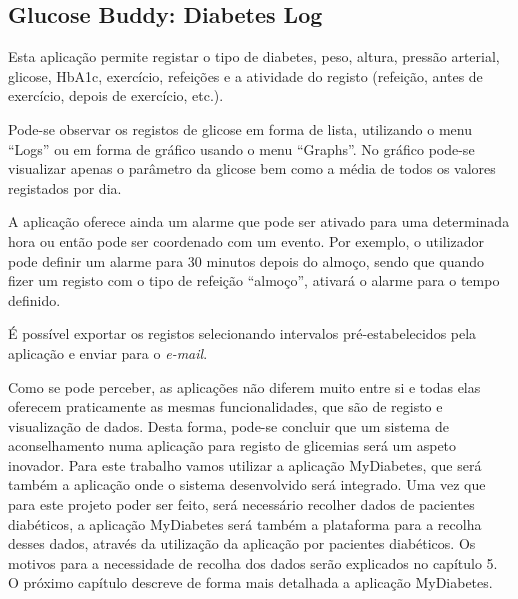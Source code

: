 \subsection{Glucose Buddy: Diabetes Log}

Esta aplicação permite registar o tipo de diabetes, peso, altura, pressão arterial, glicose, HbA1c, exercício, refeições e a atividade do registo (refeição, antes de exercício, depois de exercício, etc.).

Pode-se observar os registos de glicose em forma de lista, utilizando o menu ``Logs'' ou em forma de gráfico usando o menu ``Graphs''. No gráfico pode-se visualizar apenas o parâmetro da glicose bem como a média de todos os valores registados por dia.

A aplicação oferece ainda um alarme que pode ser ativado para uma determinada hora ou então pode ser coordenado com um evento. Por exemplo, o utilizador pode definir um alarme para 30 minutos depois do almoço, sendo que quando fizer um registo com o tipo de refeição ``almoço'', ativará o alarme para o tempo definido. 

É possível exportar os registos selecionando intervalos pré-estabelecidos pela aplicação e enviar para o \textit{e-mail}.\newline


Como se pode perceber, as aplicações não diferem muito entre si e todas elas oferecem praticamente as mesmas funcionalidades, que são de registo e visualização de dados. Desta forma, pode-se concluir que um sistema de aconselhamento numa aplicação para registo de glicemias será um aspeto inovador. 
Para este trabalho vamos utilizar a aplicação MyDiabetes, que será também a aplicação onde o sistema desenvolvido será integrado. Uma vez que para este projeto poder ser feito, será necessário recolher dados de pacientes diabéticos, a aplicação MyDiabetes será também a plataforma para a recolha desses dados, através da utilização da aplicação por pacientes diabéticos. Os motivos para a necessidade de recolha dos dados serão explicados no capítulo 5. O próximo capítulo descreve de forma mais detalhada a aplicação MyDiabetes.









